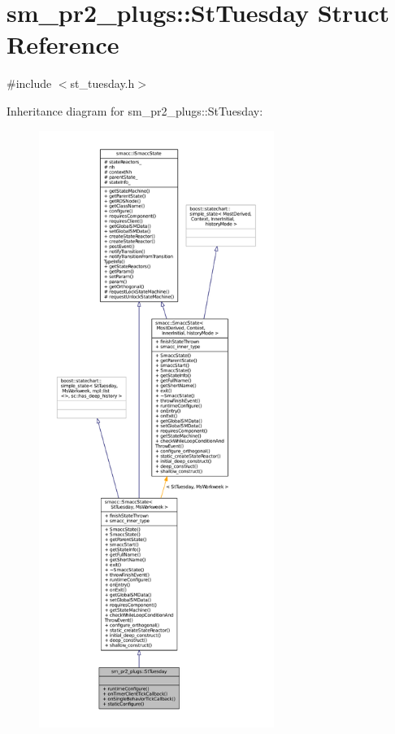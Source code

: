\hypertarget{structsm__pr2__plugs_1_1StTuesday}{}\section{sm\+\_\+pr2\+\_\+plugs\+:\+:St\+Tuesday Struct Reference}
\label{structsm__pr2__plugs_1_1StTuesday}


{\ttfamily \#include $<$st\+\_\+tuesday.\+h$>$}



Inheritance diagram for sm\+\_\+pr2\+\_\+plugs\+:\+:St\+Tuesday\+:
\nopagebreak
\begin{figure}[H]
\begin{center}
\leavevmode
\includegraphics[height=550pt]{structsm__pr2__plugs_1_1StTuesday__inherit__graph}
\end{center}
\end{figure}


